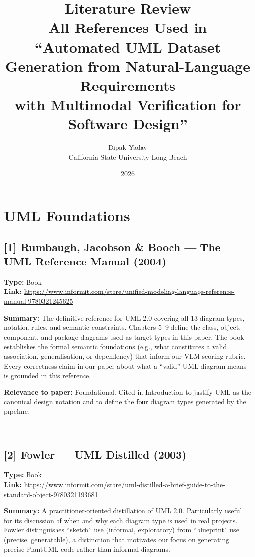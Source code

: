 \documentclass[11pt]{article}
\title{\textbf{Literature Review} \\[6pt]
\large All References Used in\\
``Automated UML Dataset Generation from Natural-Language Requirements\\
with Multimodal Verification for Software Design''}
\author{Dipak Yadav \\ California State University Long Beach}
\date{2026}
\begin{document}
\maketitle
\tableofcontents
\newpage

\section{UML Foundations}

\subsection*{[1] Rumbaugh, Jacobson \& Booch — The UML Reference Manual (2004)}
\textbf{Type:} Book \\
\textbf{Link:} \url{https://www.informit.com/store/unified-modeling-language-reference-manual-9780321245625}

\textbf{Summary:} The definitive reference for UML 2.0 covering all 13 diagram types, notation rules, and semantic constraints. Chapters 5–9 define the class, object, component, and package diagrams used as target types in this paper. The book establishes the formal semantic foundations (e.g., what constitutes a valid association, generalisation, or dependency) that inform our VLM scoring rubric. Every correctness claim in our paper about what a ``valid'' UML diagram means is grounded in this reference.

\textbf{Relevance to paper:} Foundational. Cited in Introduction to justify UML as the canonical design notation and to define the four diagram types generated by the pipeline.

---

\subsection*{[2] Fowler — UML Distilled (2003)}
\textbf{Type:} Book \\
\textbf{Link:} \url{https://www.informit.com/store/uml-distilled-a-brief-guide-to-the-standard-object-9780321193681}

\textbf{Summary:} A practitioner-oriented distillation of UML 2.0. Particularly useful for its discussion of when and why each diagram type is used in real projects. Fowler distinguishes ``sketch'' use (informal, exploratory) from ``blueprint'' use (precise, generatable), a distinction that motivates our focus on generating precise PlantUML code rather than informal diagrams.
\end{document}
